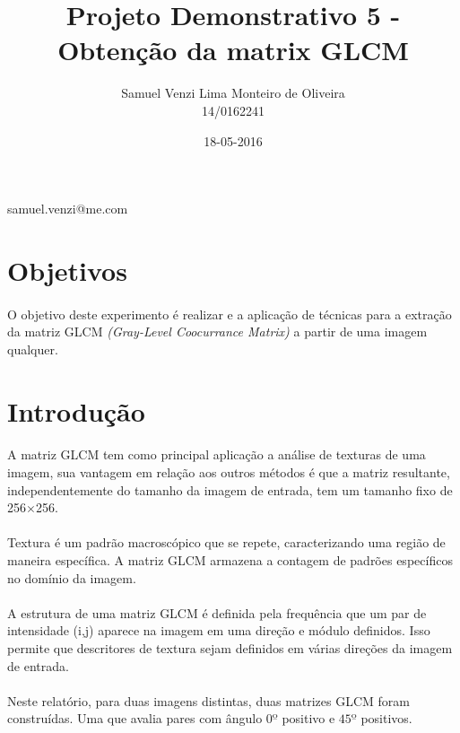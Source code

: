 \documentclass[conference, harvard, brazil, english]{sbatex}
\begin{document}
	\title{Projeto Demonstrativo 5 - Obtenção da matrix GLCM}
	\date{18-05-2016}
	\author{Samuel Venzi Lima Monteiro de Oliveira\\14/0162241}{samuel.venzi@me.com}
	\address{SQN 208\\Brasília\\Brasil}
	
	
	\section{Objetivos}
		\paragraph{}
		O objetivo deste experimento é realizar e a aplicação de técnicas para a extração da matriz GLCM \textit{(Gray-Level Coocurrance Matrix)} a partir de uma imagem qualquer.
		
	\section{Introdução}
		\paragraph{}
		A matriz GLCM tem como principal aplicação a análise de texturas de uma imagem, sua vantagem em relação aos outros métodos é que a matriz resultante, independentemente do tamanho da imagem de entrada, tem um tamanho fixo de 256$\times$256. 
		\paragraph{}
		Textura é um padrão macroscópico que se repete, caracterizando uma região de maneira específica. A matriz GLCM armazena a contagem de padrões específicos no domínio da imagem.
		\paragraph{}
		A estrutura de uma matriz GLCM é definida pela frequência que um par de intensidade (i,j) aparece na imagem em uma direção e módulo definidos. Isso permite que descritores de textura sejam definidos em várias direções da imagem de entrada.
		\paragraph{}
		Neste relatório, para duas imagens distintas, duas matrizes GLCM foram construídas. Uma que avalia pares com ângulo $0º$ positivo e $45º$ positivos. 
	
\end{document}
